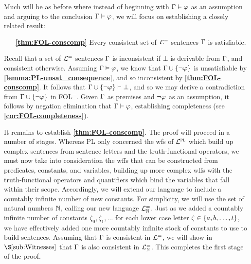 Much will be as before where instead of beginning with $\Gamma\vDash\varphi$ as an assumption and arguing to the conclusion $\Gamma\vdash\varphi$, we will focus on establishing a closely related result: 
\begin{enumerate}[leftmargin=1.5in]
  \item[\textbf{\ref{thm:FOL-conscomp}}] Every consistent set of $\mathcal{L}^{=}$ sentences $\Gamma$ is satisfiable. 
\end{enumerate}
Recall that a set of $\mathcal{L}^{=}$ sentences $\Gamma$ is inconsistent if $\bot$ is derivable from $\Gamma$, and consistent otherwise.
Assuming $\Gamma\vDash\varphi$, we know that $\Gamma\cup\lbrace\neg\varphi\rbrace$ is unsatisfiable by \textbf{\ref{lemma:PL-unsat_consequence}}, and so inconsistent by \textbf{\ref{thm:FOL-conscomp}}.
It follows that $\Gamma\cup\lbrace\neg\varphi\rbrace\vdash\bot$, and so we may derive a contradiction from $\Gamma\cup\lbrace\neg\varphi\rbrace$ in FOL$^=$.
Given $\Gamma$ as premises and $\neg\varphi$ as an assumption, it follows by negation elimination that $\Gamma \vdash \varphi$, establishing completeness (see \textbf{\ref{cor:FOL-completeness}}).

It remains to establish \textbf{\ref{thm:FOL-conscomp}}.
The proof will proceed in a number of stages.
Whereas PL only concerned the wfs of $\mathcal{L}^{\textsc{pl}}$ which build up complex sentences from sentence letters and the truth-functional operators, we must now take into consideration the wffs that can be constructed from predicates, constants, and variables, building up more complex wffs with the truth-functional operators and quantifiers which bind the variables that fall within their scope.
Accordingly, we will extend our language to include a countably infinite number of new constants.
For simplicity, we will use the set of natural numbers $\mathbb{N}$, calling our new language $\mathcal{L}^{=}_{\mathbb{N}}$. 
Just as we added a countably infinite number of constants $\zeta_0, \zeta_1, \ldots$ for each lower case letter $\zeta \in \lbrace a, b, \ldots, t\rbrace$, we have effectively added one more countably infinite stock of constants to use to build sentences.
Assuming that $\Gamma$ is consistent in $\mathcal{L}^{=}$, we will show in $\S\ref{sub:Witnesses}$ that $\Gamma$ is also consistent in $\mathcal{L}^{=}_{\mathbb{N}}$.
This completes the first stage of the proof.

